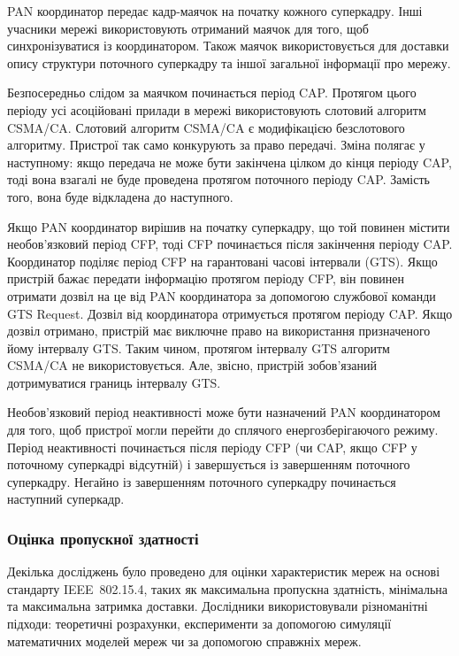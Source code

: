 \documentclass[a4paper,ukrainian,utf8,nocolumnsxix,floatsection]{eskdtext}
\renewcommand\paragraph{\subsubsection}
\newcommand{\iee}[0]{IEEE~802.15.4\xspace}
\newcommand{\csma}[0]{CSMA/CA\xspace}
\begin{document}
PAN координатор передає кадр-маячок на початку кожного суперкадру. Інші учасники мережі використовують отриманий маячок для того, щоб синхронізуватися із координатором. Також маячок використовується для доставки опису структури поточного суперкадру та іншої загальної інформації про мережу. 

Безпосередньо слідом за маячком починається період CAP. Протягом цього періоду усі асоційовані прилади в мережі використовують слотовий алгоритм \csma. Слотовий алгоритм \csma є модифікацією безслотового алгоритму. Пристрої так само конкурують за право передачі. Зміна полягає у наступному: якщо передача не може бути закінчена цілком до кінця періоду CAP, тоді вона взагалі не буде проведена протягом поточного періоду CAP. Замість того, вона буде відкладена до наступного. %

Якщо PAN координатор вирішив на початку суперкадру, що  той повинен містити необов’язковий період CFP, тоді CFP починається після закінчення періоду CAP. Координатор поділяє період CFP на гарантовані часові інтервали (GTS). Якщо пристрій бажає передати інформацію протягом періоду CFP, він повинен отримати дозвіл на це від PAN координатора за допомогою службової команди GTS Request. Дозвіл від координатора отримується протягом періоду CAP. Якщо дозвіл отримано, пристрій має виключне право на використання призначеного йому інтервалу GTS. Таким чином, протягом інтервалу GTS алгоритм \csma не використовується. Але, звісно, пристрій зобов’язаний дотримуватися границь інтервалу GTS. 

Необов’язковий період неактивності може бути назначений PAN координатором для того, щоб пристрої могли перейти до сплячого енергозберігаючого режиму. Період неактивності починається після періоду CFP (чи CAP, якщо CFP у поточному суперкадрі відсутній) і завершується із завершенням поточного суперкадру.
Негайно із завершенням поточного суперкадру починається наступний суперкадр. 

\paragraph{Оцінка пропускної здатності}
\label{par:throughput:evaluation}

Декілька досліджень було проведено для оцінки характеристик мереж на основі стандарту \iee, таких як максимальна пропускна здатність, мінімальна та максимальна затримка доставки. Дослідники використовували різноманітні підходи: теоретичні розрахунки, експерименти за допомогою симуляції математичних моделей мереж чи за допомогою справжніх мереж.
\end{document}
